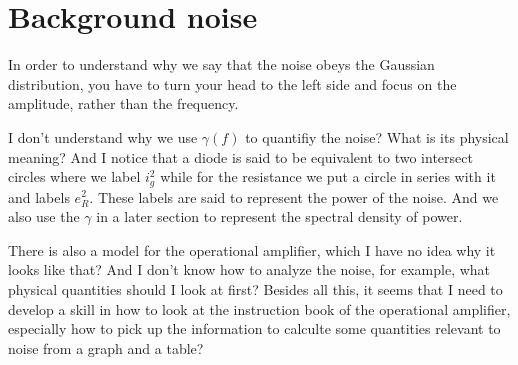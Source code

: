 \section{Background noise}
In order to understand why we say that the noise obeys the Gaussian distribution, you have to turn your head to the left side and focus on the amplitude, rather than the frequency.

I don't understand why we use $\gamma(f)$ to quantifiy the noise? What is its physical meaning? And I notice that a diode is said to be equivalent to two intersect circles where we label $i_g^2$ while for the resistance we put a circle in series with it and labels $e_R^2$. These labels are said to represent the power of the noise. And we also use the $\gamma$ in a later section to represent the spectral density of power.

There is also a model for the operational amplifier, which I have no idea why it looks like that? And I don't know how to analyze the noise, for example, what physical quantities should I look at first? Besides all this, it seems that I need to develop a skill in how to look at the instruction book of the operational amplifier, especially how to pick up the information to calculte some quantities relevant to noise from a graph and a table?

